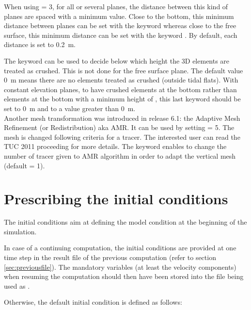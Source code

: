 When using  = 3, for all or several planes,
the distance between this kind of planes are spaced with a minimum value.
Close to the bottom, this minimum distance between planes can be set with the
keyword 
whereas close to the free surface, this minimum distance can be set with the
keyword .
By default, each distance is set to 0.2~m.

The keyword  can be used
to decide below which height the 3D elements are treated as crushed.
This is not done for the free surface plane.
The default value 0~m means there are no elements treated as crushed
(outside tidal flats).
With constant elevation planes, to have crushed elements at the bottom rather
than elements at the bottom with a minimum height of
,
this last keyword should be set to 0~m and
 to a value greater than 0~m.
\\

Another mesh transformation was introduced in release 6.1:
the Adaptive Mesh Refinement (or Redistribution) aka AMR.
It can be used by setting  = 5.
The mesh is changed following criteria for a tracer.
The interested user can read the TUC 2011 proceeding \cite{Cawthorn2011}
for more details.
The keyword  enables to change the number of
tracer given to AMR algorithm in order to adapt the vertical mesh (default = 1).


\section{Prescribing the initial conditions}

The initial conditions aim at defining the model condition at the beginning of
the simulation.

In case of a continuing computation, the initial conditions are provided at one
time step in the result file of the previous computation (refer to section
\ref{sec:previousfile}).
The mandatory variables (at least the velocity components) when resuming
the computation should then have been stored into the file being used as
.

Otherwise, the default initial condition is defined as follows:

